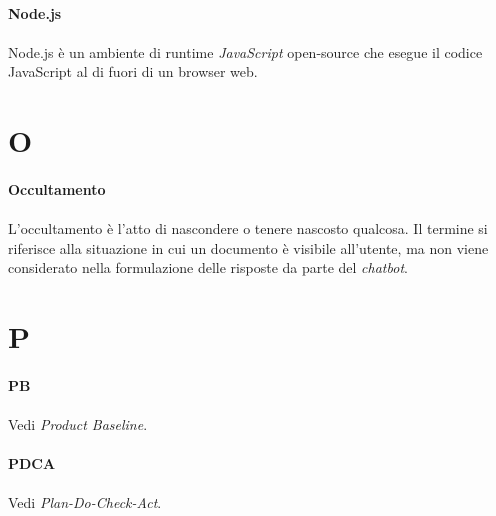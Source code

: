 \documentclass[10pt, a4paper]{article}
\begin{document}
\paragraph{Node.js}\noindent\hrulefill
\paragraph{}Node.js è un ambiente di runtime \textit{JavaScript\pg} open-source che esegue il codice JavaScript al di fuori di un browser web.


\newpage
\section{O}

\vspace{2em}
\paragraph{Occultamento}\noindent\hrulefill
\paragraph{}L’occultamento è l’atto di nascondere o tenere nascosto qualcosa. Il termine si riferisce alla situazione in cui un documento è visibile all’utente, ma non viene considerato nella formulazione delle risposte da parte del \textit{chatbot\pg}.



\newpage
\section{P}




\vspace{2em}
\paragraph{PB}\noindent\hrulefill 
\paragraph{}Vedi \textit{Product Baseline\pg}.

\vspace{2em}
\paragraph{PDCA}\noindent\hrulefill 
\paragraph{}Vedi \textit{Plan-Do-Check-Act\pg}.
\end{document}
